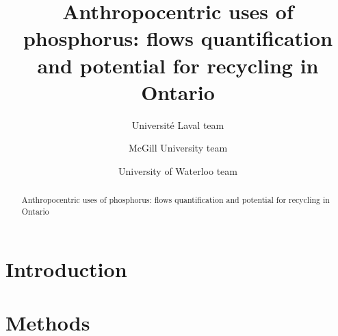 \documentclass[authoryear]{elsarticle}
\begin{document}
\begin{frontmatter}
	\title{Anthropocentric uses of phosphorus: flows quantification and potential for recycling in Ontario}
	
	\author[ULaval]{Université Laval team}
	\author[McGill]{McGill University team}
	\author[Waterloo]{University of Waterloo team}
		
	\address[ULaval]{Université Laval}
	\address[McGill]{McGill University}
	\address[Waterloo]{University of Waterloo}
	
	\begin{abstract}
		Anthropocentric uses of phosphorus: flows quantification and potential for recycling in Ontario
	\end{abstract}
%	
\end{frontmatter}


\section{Introduction}

\section{Methods}

%
\end{document}
